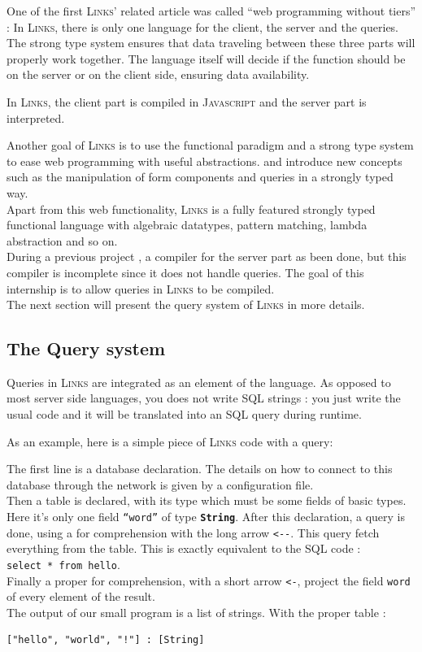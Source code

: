 \documentclass[11pt]{article}
\newcommand\mysc[1]{{\rmfamily\textsc{#1}}\xspace}
\newcommand\links{\mysc{Links}}
\newcommand\sql{\mysc{SQL}}
\newcommand\js{\mysc{Javascript}}
\newcommand\sig[1]{{\tt\bf #1}}
\newcommand\code[1]{{\tt #1}}
\newcommand\linkslst[1]{}
\begin{document}
One of the first \links' related article \cite{links:tiers} was called ``web programming without tiers'' : In \links, there is only one language for the client, the server and the queries. 
The strong type system ensures that data traveling between these three parts will properly work together. 
The language itself will decide if the function should be on the server or on the client side, ensuring data availability.

In \links, the client part is compiled in \js and the server part is interpreted.

Another goal of \links is to use the functional paradigm and a strong type system to ease web programming with useful abstractions. \cite{links:formlets} and \cite{links:effect} introduce new concepts such as the manipulation of form components and queries in a strongly typed way.\\

Apart from this web functionality, \links is a fully featured strongly typed functional language with algebraic datatypes, pattern matching, lambda abstraction and so on.\\

During a previous project \cite{links:comp}, a compiler for the server part as been done, but this compiler is incomplete since it does not handle queries. The goal of this internship is to allow queries in \links to be compiled.\\

The next section will present the query system of \links in more details.

\subsection{The Query system\label{intro:query}}

Queries in \links are integrated as an element of the language. As opposed to most server side languages, you does not write \sql strings : you just write the usual code and it will be translated into an \sql query during runtime.

As an example, here is a simple piece of \links code with a query: 
\linkslst{simplequery.links}
The first line is a database declaration. The details on how to connect to this database through the network is given by a configuration file.\\
Then a table is declared, with its type which must be some fields of basic types. Here it's only one field \code{``word''} of type \sig{String}.\newpage
After this declaration, a query is done, using a for comprehension with the long arrow \code{<-\--}. This query fetch everything from the table. This is exactly equivalent to the \sql code :\\ \verb+select * from hello+.\\
 Finally a proper for comprehension, with a short arrow \code{<-}, project the field \code{word} of every element of the result.\\
The output of our small program is a list of strings. With the proper table :
\begin{lstlisting}
["hello", "world", "!"] : [String]
\end{lstlisting}\ 
\end{document}
